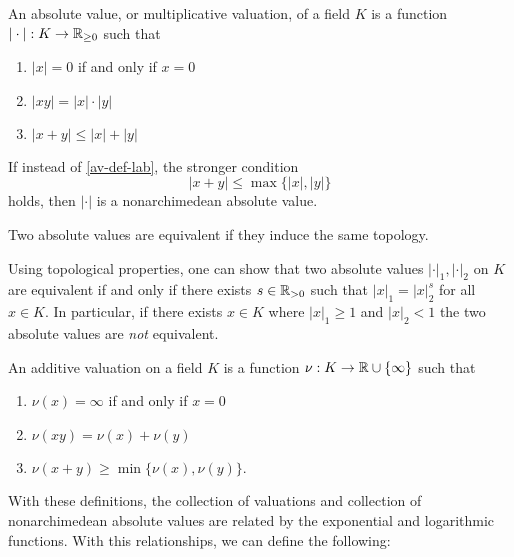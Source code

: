 \begin{definition}
    An absolute value, or multiplicative valuation, of a field $K$ is a function $|\cdot|: K \to \mathbb{R}_{\geq 0}$ such that

    \begin{enumerate}[(1)]
        \item $|x| = 0$ if and only if $x = 0$
        \item $|xy| = |x|\cdot |y|$
        \item $|x+y| \leq |x| + |y|$ \label{av-def-lab}
    \end{enumerate}

    If instead of \ref{av-def-lab}, the stronger condition
        \[|x+y| \leq \max\{|x|, |y|\}\]
    holds, then $|\cdot|$ is a nonarchimedean absolute value.
\end{definition}

\begin{definition}[Equivalent]
    Two absolute values are equivalent if they induce the same topology.
\end{definition}

Using topological properties, one can show that two absolute values $|\cdot|_1, |\cdot|_2$ on $K$ are equivalent if and only if there exists $s \in \mathbb{R}_{>0}$ such that $|x|_1 = |x|_2^s$ for all $x \in K$. In particular, if there exists $x \in K$ where $|x|_1 \geq 1$ and $|x|_2 < 1$ the two absolute values are \emph{not} equivalent.

\begin{definition}
    An additive valuation on a field $K$ is a function $\nu: K \to \mathbb{R} \cup \{\infty\}$ such that 
    \begin{enumerate}[(1)]
        \item $\nu(x) = \infty$ if and only if  $x = 0$
        \item $\nu(xy) = \nu(x) + \nu(y)$
        \item $\nu(x+y) \geq \min\{\nu(x), \nu(y)\}$.
    \end{enumerate}
\end{definition}

With these definitions, the collection of valuations and collection of nonarchimedean absolute values are related by the exponential and logarithmic functions. With this relationships, we can define the following:

